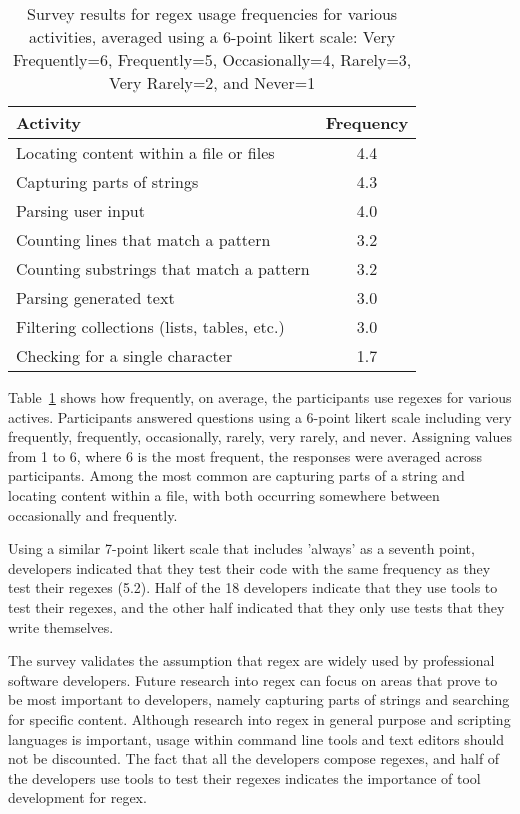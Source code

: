\begin{table}
\caption{Survey results for regex usage frequencies for various activities, averaged using a 6-point likert scale: Very Frequently=6, Frequently=5, Occasionally=4, Rarely=3, Very Rarely=2, and Never=1 \label{tab:regexactivities}}
\begin{center}
\begin{tabular}{l|c}
Activity & Frequency \\ \hline
Locating content within a file or files & 4.4\\
Capturing parts of strings & 4.3 \\
Parsing user input & 4.0\\
Counting lines that match a pattern & 3.2\\
Counting  substrings that match a pattern & 3.2\\
Parsing generated text & 3.0\\
Filtering collections (lists, tables, etc.) & 3.0 \\
Checking for a single character & 1.7\\


\end{tabular}
\end{center}
\end{table}

Table~\ref{tab:regexactivities} shows how frequently, on average, the participants use
regexes for various actives.
Participants answered questions using a 6-point likert scale including very frequently, frequently, occasionally, rarely, very rarely, and never.
Assigning values from 1 to 6, where 6 is the most frequent, the responses were averaged across participants.
Among the most common are capturing parts of a string and locating content within a file, with both occurring somewhere between occasionally and frequently. 

Using a similar 7-point likert scale that includes 'always' as a seventh point, developers indicated that they test their code with the same frequency as they test their regexes (5.2).  Half of the 18 developers indicate that they use tools to test their regexes, and the other half indicated that they only use tests that they write themselves.

The survey validates the assumption that regex are widely used by professional software developers.  Future research into regex can focus on areas that prove to be most important to developers, namely capturing parts of strings and searching for specific content.  Although research into regex in general purpose and scripting languages is important, usage within command line tools and text editors should not be discounted.  The fact that all the developers compose regexes, and half of the developers use tools to test their regexes indicates the importance of tool development for regex.
